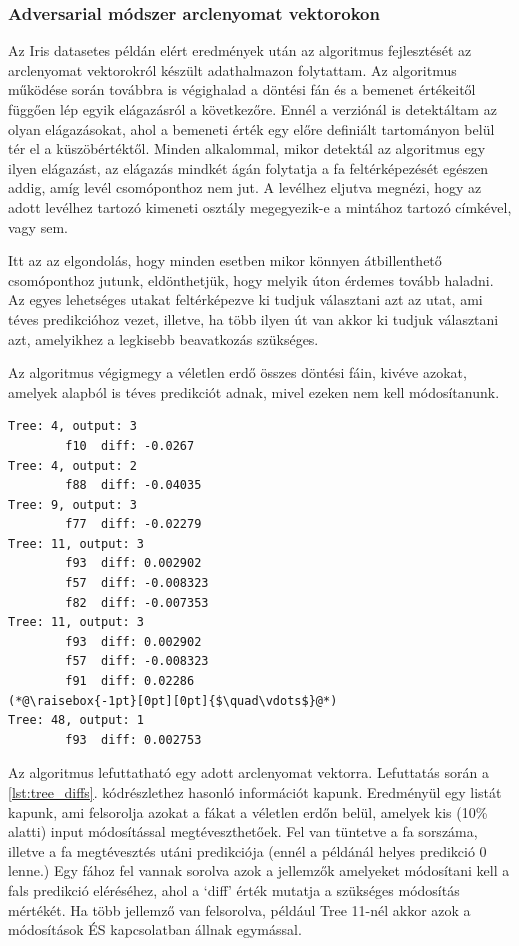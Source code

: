 \subsubsection*{Adversarial módszer arclenyomat vektorokon}

Az Iris datasetes példán elért eredmények után az algoritmus fejlesztését az arclenyomat vektorokról készült adathalmazon folytattam. Az algoritmus működése során továbbra is végighalad a döntési fán és a bemenet értékeitől függően lép egyik elágazásról a következőre. Ennél a verziónál is detektáltam az olyan elágazásokat, ahol a bemeneti érték egy előre definiált tartományon belül tér el a küszöbértéktől. Minden alkalommal, mikor detektál az algoritmus egy ilyen elágazást, az elágazás mindkét ágán folytatja a fa feltérképezését egészen addig, amíg levél csomóponthoz nem jut. A levélhez eljutva megnézi, hogy az adott levélhez tartozó kimeneti osztály megegyezik-e a mintához tartozó címkével, vagy sem.

Itt az az elgondolás, hogy minden esetben mikor könnyen átbillenthető csomóponthoz jutunk, eldönthetjük, hogy melyik úton érdemes tovább haladni. Az egyes lehetséges utakat feltérképezve ki tudjuk választani azt az utat, ami téves predikcióhoz vezet, illetve, ha több ilyen út van akkor ki tudjuk választani azt, amelyikhez a legkisebb beavatkozás szükséges. 

Az algoritmus végigmegy a véletlen erdő összes döntési fáin, kivéve azokat, amelyek alapból is téves predikciót adnak, mivel ezeken nem kell módosítanunk.

\begin{lstlisting}[caption={Algoritmus futtatása egy adott arclenyomat vektorra.}, label=lst:tree_diffs]
Tree: 4, output: 3
		f10  diff: -0.0267
Tree: 4, output: 2
		f88  diff: -0.04035
Tree: 9, output: 3
		f77  diff: -0.02279
Tree: 11, output: 3
		f93  diff: 0.002902
		f57  diff: -0.008323
		f82  diff: -0.007353
Tree: 11, output: 3
		f93  diff: 0.002902
		f57  diff: -0.008323
		f91  diff: 0.02286
(*@\raisebox{-1pt}[0pt][0pt]{$\quad\vdots$}@*)
Tree: 48, output: 1
		f93  diff: 0.002753
\end{lstlisting}

Az algoritmus lefuttatható egy adott arclenyomat vektorra. Lefuttatás során a \ref{lst:tree_diffs}. kódrészlethez hasonló információt kapunk. Eredményül egy listát kapunk, ami felsorolja azokat a fákat a véletlen erdőn belül, amelyek kis (10\% alatti) input módosítással megtéveszthetőek. Fel van tüntetve a fa sorszáma, illetve a fa megtévesztés utáni predikciója (ennél a példánál helyes predikció 0 lenne.) Egy fához fel vannak sorolva azok a jellemzők amelyeket módosítani kell a fals predikció eléréséhez, ahol a ‘diff’ érték mutatja a szükséges módosítás mértékét. Ha több jellemző van felsorolva, például Tree 11-nél akkor azok a módosítások ÉS kapcsolatban állnak egymással.

